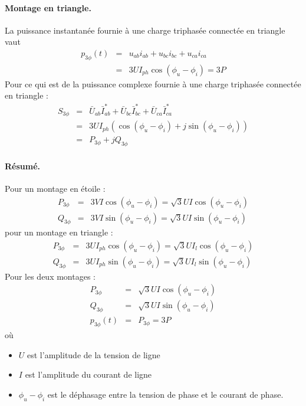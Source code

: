 \paragraph{Montage en triangle.}
La puissance instantanée fournie à une charge triphasée connectée en
triangle vaut 
\begin{eqnarray*}
p_{3\phi}(t)& =& u_{ab}i_{ab}+u_{bc}i_{bc}+u_{ca}i_{ca}\\
& = & 3UI_{ph}\cos(\phi_u-\phi_i)=3P
\end{eqnarray*}
Pour ce qui est de la puissance complexe fournie à une charge triphasée connectée en triangle :
\begin{eqnarray*}
	S_{3\phi}& = &\bar{U}_{ab}\bar{I}_{ab}^*+\bar{U}_{bc}\bar{I}_{bc}^*+\bar{U}_{ca}\bar{I}_{ca}^*\\
	& = & 3UI_{ph}(\cos(\phi_u-\phi_i)+j\sin(\phi_u-\phi_i))\\
	& =& P_{3\phi}+jQ_{3\phi}
\end{eqnarray*}

\paragraph{Résumé.}
Pour un montage en étoile :
\begin{eqnarray*}
	P_{3\phi}& =& 3VI\cos(\phi_u-\phi_i)= \sqrt{3}UI\cos(\phi_u-\phi_i)\\
	Q_{3\phi}& = & 3VI\sin(\phi_u-\phi_i)= \sqrt{3}UI\sin(\phi_u-\phi_i)
\end{eqnarray*}
pour un montage en triangle :
{\small \begin{eqnarray*}
		P_{3\phi}& =& 3UI_{ph}\cos(\phi_u-\phi_i)= \sqrt{3}UI_{l}\cos(\phi_u-\phi_i)\\
		Q_{3\phi}& = & 3UI_{ph}\sin(\phi_u-\phi_i)= \sqrt{3}UI_{l}\sin(\phi_u-\phi_i)
	\end{eqnarray*}}
Pour les deux montages :
\begin{eqnarray*}
	P_{3\phi}& =& \sqrt{3}UI\cos(\phi_u-\phi_i)\\
	Q_{3\phi}& = & \sqrt{3}UI\sin(\phi_u-\phi_i)\\
	p_{3\phi}(t)& = & P_{3\phi}=3P
\end{eqnarray*}
où
\begin{itemize}
	\item $U$ est l'amplitude de la tension de ligne
	\item $I$ est l'amplitude du courant de ligne
	\item $\phi_u-\phi_i$ est le déphasage entre la tension de phase et le
	courant de phase.
\end{itemize}

